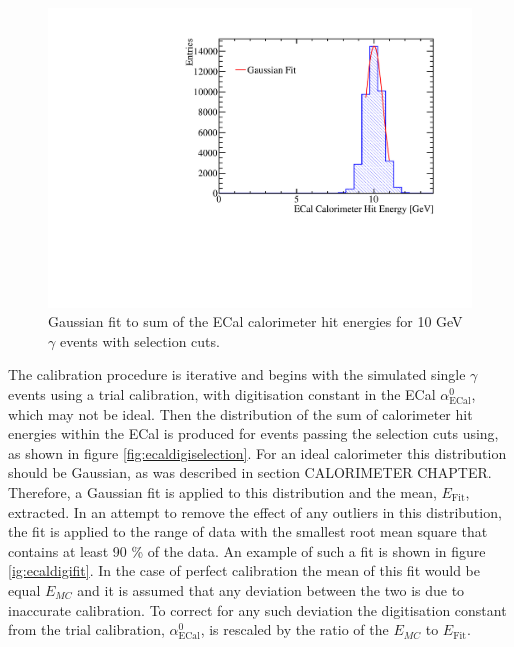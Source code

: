 \begin{figure}
\includegraphics[width=\largefigwidth]{EnergyEstimators/Plots/Calibration/Digitsation/ECal/DigitisationECalFit.pdf}
\caption[Gaussian fit to sum of the ECal calorimeter hit energies for 10 GeV $\gamma$ events with selection cuts.]{Gaussian fit to sum of the ECal calorimeter hit energies for 10 GeV $\gamma$ events with selection cuts.}
\label{fig:ecaldigifit}
\end{figure}

The calibration procedure is iterative and begins with the simulated single $\gamma$ events using a trial calibration, with digitisation constant in the ECal $\alpha^{0}_{\text{ECal}}$, which may not be ideal.  Then the distribution of the sum of calorimeter hit energies within the ECal is produced for events passing the selection cuts using, as shown in figure \ref{fig:ecaldigiselection}.  For an ideal calorimeter this distribution should be Gaussian, as was described in section CALORIMETER CHAPTER.  Therefore, a Gaussian fit is applied to this distribution and the mean, $E_{\text{Fit}}$, extracted.  In an attempt to remove the effect of any outliers in this distribution, the fit is applied to the range of data with the smallest root mean square that contains at least 90 \% of the data.  An example of such a fit is shown in figure \ref{ig:ecaldigifit}.  In the case of perfect calibration the mean of this fit would be equal $E_{MC}$ and it is assumed that any deviation between the two is due to inaccurate calibration.  To correct for any such deviation the digitisation constant from the trial calibration, $\alpha^{0}_{\text{ECal}}$, is rescaled by the ratio of the $E_{MC}$ to $E_{\text{Fit}}$.

